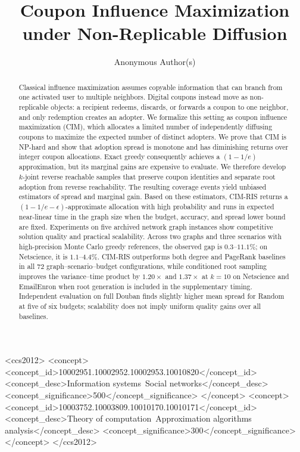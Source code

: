 \documentclass[sigconf,balance=false]{acmart}
\newcommand{\CIMRIS}{\textsc{CIM-RIS}}
\begin{document}
\title{Coupon Influence Maximization under Non-Replicable Diffusion}

\author{Anonymous Author(s)}

\renewcommand{\shortauthors}{Anon.}

\begin{abstract}
Classical influence maximization assumes copyable information that can
branch from one activated user to multiple neighbors.
Digital coupons instead move as non-replicable objects: a recipient
redeems, discards, or forwards a coupon to one neighbor, and only
redemption creates an adopter.
We formalize this setting as coupon influence maximization (CIM), which
allocates a limited number of independently diffusing coupons to maximize
the expected number of distinct adopters.
We prove that CIM is NP-hard and show that adoption spread is monotone
and has diminishing returns over integer coupon allocations.
Exact greedy consequently achieves a $(1-1/e)$ approximation, but its
marginal gains are expensive to evaluate.
We therefore develop $k$-joint reverse reachable samples that preserve
coupon identities and separate root adoption from reverse reachability.
The resulting coverage events yield unbiased estimators of spread and
marginal gain.
Based on these estimators, \CIMRIS{} returns a
$(1-1/e-\epsilon)$-approximate allocation with high probability and runs
in expected near-linear time in the graph size when the budget, accuracy,
and spread lower bound are fixed.
Experiments on five archived network graph instances show
competitive solution quality and practical scalability. Across two graphs
and three scenarios with high-precision Monte Carlo greedy references, the
observed gap is $0.3$--$11.1\%$; on Netscience, it is $1.1$--$4.4\%$.
\CIMRIS{} outperforms both degree and PageRank baselines in all 72
graph--scenario--budget configurations, while
conditioned root sampling improves the variance--time product by
$1.20\times$ and $1.37\times$ at $k=10$ on Netscience and EmailEnron
when root generation is included in the supplementary timing.
Independent evaluation on full Douban finds slightly higher mean spread
for Random at five of six budgets; scalability does not imply uniform
quality gains over all baselines.
\end{abstract}

\begin{CCSXML}
<ccs2012>
 <concept>
  <concept_id>10002951.10002952.10002953.10010820</concept_id>
  <concept_desc>Information systems~Social networks</concept_desc>
  <concept_significance>500</concept_significance>
 </concept>
 <concept>
  <concept_id>10003752.10003809.10010170.10010171</concept_id>
  <concept_desc>Theory of computation~Approximation algorithms analysis</concept_desc>
  <concept_significance>300</concept_significance>
 </concept>
</ccs2012>
\end{CCSXML}
\end{document}
